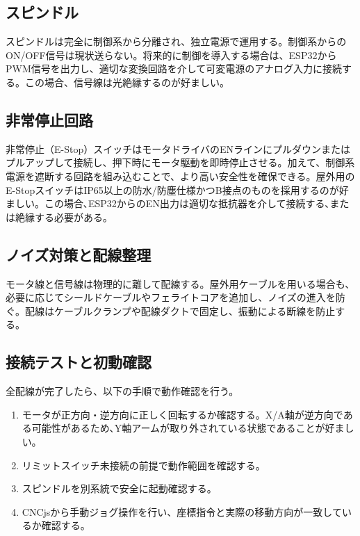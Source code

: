 \documentclass[uplatex,dvipdfmx]{ujarticle}
\begin{document}
\subsection{スピンドル}

スピンドルは完全に制御系から分離され、独立電源で運用する。制御系からのON/OFF信号は現状送らない。将来的に制御を導入する場合は、ESP32からPWM信号を出力し、適切な変換回路を介して可変電源のアナログ入力に接続する。この場合、信号線は光絶縁するのが好ましい。

\subsection{非常停止回路}

非常停止（E-Stop）スイッチはモータドライバのENラインにプルダウンまたはプルアップして接続し、押下時にモータ駆動を即時停止させる。加えて、制御系電源を遮断する回路を組み込むことで、より高い安全性を確保できる。屋外用のE-StopスイッチはIP65以上の防水/防塵仕様かつB接点のものを採用するのが好ましい。この場合､ESP32からのEN出力は適切な抵抗器を介して接続する､または絶縁する必要がある｡

\subsection{ノイズ対策と配線整理}

モータ線と信号線は物理的に離して配線する。屋外用ケーブルを用いる場合も、必要に応じてシールドケーブルやフェライトコアを追加し、ノイズの進入を防ぐ。配線はケーブルクランプや配線ダクトで固定し、振動による断線を防止する。

\subsection{接続テストと初動確認}

全配線が完了したら、以下の手順で動作確認を行う。

\begin{enumerate}
\item モータが正方向・逆方向に正しく回転するか確認する。X/A軸が逆方向である可能性があるため､Y軸アームが取り外されている状態であることが好ましい｡
\item リミットスイッチ未接続の前提で動作範囲を確認する。
\item スピンドルを別系統で安全に起動確認する。
\item CNCjsから手動ジョグ操作を行い、座標指令と実際の移動方向が一致しているか確認する。
\end{enumerate}
\end{document}
